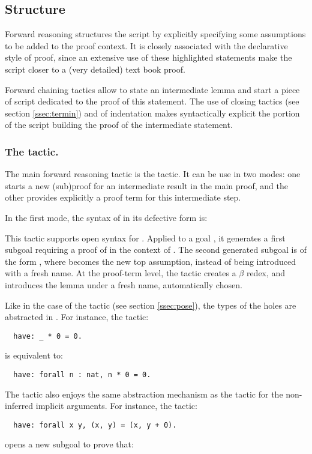 \subsection{Structure}\label{ssec:struct}

Forward reasoning structures the script by explicitly specifying some
assumptions to be added to the proof context. It is closely associated
with the declarative style of proof, since an extensive use of these
highlighted statements
make the script closer to a (very detailed) text book proof.

Forward chaining tactics allow to state an intermediate lemma and start a
piece of script dedicated to the proof of this statement. The use of
closing tactics (see section \ref{ssec:termin}) and of
indentation makes syntactically explicit the portion of the script
building the proof of the intermediate statement.

\subsubsection*{The  tactic.}
\label{sssec:have}

The main \ssr{} forward reasoning tactic is the  tactic. It
can be use in two modes: one starts a new (sub)proof for an
intermediate result in the main proof, and the other
provides explicitly a proof term for this intermediate step.

In the first mode, the syntax of  in its defective form is:


This tactic supports open syntax for {\term}.
Applied to a goal , it generates a first subgoal requiring a
proof of {\term} in the context of . The  second generated
subgoal is of the form {\term} , where {\term} becomes
the new top assumption, instead of being introduced with a fresh
name. At the proof-term level, the  tactic creates a $\beta$
redex, and introduces the lemma under a fresh name, automatically
chosen.


Like in the case of the  tactic (see section \ref{ssec:pose}),
the types of the holes are abstracted in {\term}.
For instance, the tactic:
\begin{lstlisting}
  have: _ * 0 = 0.
\end{lstlisting}
is equivalent to:
\begin{lstlisting}
  have: forall n : nat, n * 0 = 0.
\end{lstlisting}
The  tactic also enjoys the same abstraction mechanism as the
 tactic for the non-inferred implicit arguments. For instance,
the tactic:
\begin{lstlisting}
  have: forall x y, (x, y) = (x, y + 0).
\end{lstlisting}
opens a new subgoal to prove that:

